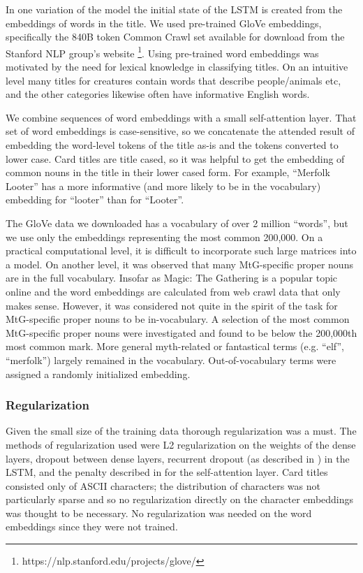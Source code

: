 \documentclass[letterpaper]{article} %
\begin{document}
In one variation of the model
the initial state of the LSTM
is created from the embeddings of words in the title.
We used pre-trained GloVe \cite{Pennington2014GloveGV} embeddings,
specifically the 840B token Common Crawl set
available for download from the Stanford NLP group's website
\footnote{https://nlp.stanford.edu/projects/glove/}.
Using pre-trained word embeddings
was motivated by the need for lexical knowledge in classifying titles.
On an intuitive level many titles for creatures
contain words that describe people/animals etc,
and the other categories likewise often have informative English words.

We combine sequences of word embeddings with a small self-attention layer.
That set of word embeddings is case-sensitive,
so we concatenate the attended result of embedding
the word-level tokens of the title as-is
and the tokens converted to lower case.
Card titles are title cased,
so it was helpful to get the embedding of common nouns in the title
in their lower cased form.
For example,
``Merfolk Looter''
has a more informative (and more likely to be in the vocabulary)
embedding for ``looter'' than for ``Looter''.

The GloVe data we downloaded has a vocabulary of over 2 million ``words'',
but we use only the embeddings representing the most common 200,000.
On a practical computational level,
it is difficult to incorporate such large matrices into a model.
On another level,
it was observed that many MtG-specific proper nouns are in the full vocabulary.
Insofar as Magic: The Gathering is a popular topic online and the word embeddings
are calculated from web crawl data that only makes sense.
However,
it was considered not quite in the spirit of the task
for MtG-specific proper nouns to be in-vocabulary.
A selection of the most common MtG-specific proper nouns were investigated
and found to be below the 200,000th most common mark.
More general myth-related or fantastical terms (e.g. ``elf'', ``merfolk'')
largely remained in the vocabulary.
Out-of-vocabulary terms were assigned a randomly initialized embedding.

\subsubsection{Regularization}

Given the small size of the training data thorough regularization was a must.
The methods of regularization used were
L2 regularization on the weights of the dense layers,
dropout between dense layers,
recurrent dropout (as described in \cite{Gal2016ATG}) in the LSTM,
and the penalty described in \cite{Lin2017ASS} for the self-attention layer.
Card titles consisted only of ASCII characters;
the distribution of characters was not particularly sparse
and so no regularization directly on the character embeddings
was thought to be necessary.
No regularization was needed on the word embeddings since they were not trained.
\end{document}
